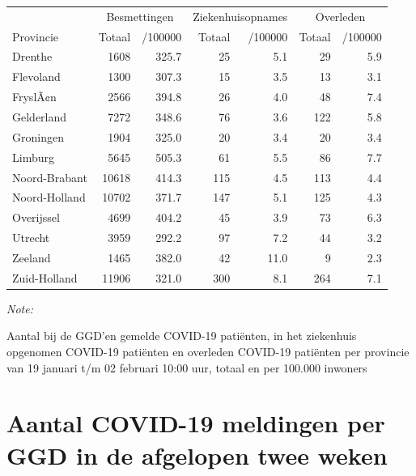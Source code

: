 \documentclass[
  english,
  man,floatsintext]{apa6}
\begin{document}
\begin{table}[H]
\centering
\begin{threeparttable}
\begin{tabular}{lrrrrrr}
\toprule
\multicolumn{1}{c}{ } & \multicolumn{2}{c}{Besmettingen} & \multicolumn{2}{c}{Ziekenhuisopnames} & \multicolumn{2}{c}{Overleden} \\
\cmidrule(l{3pt}r{3pt}){2-3} \cmidrule(l{3pt}r{3pt}){4-5} \cmidrule(l{3pt}r{3pt}){6-7}
Provincie & Totaal & /100000 & Totaal & /100000 & Totaal & /100000\\
\midrule
Drenthe & 1608 & 325.7 & 25 & 5.1 & 29 & 5.9\\
Flevoland & 1300 & 307.3 & 15 & 3.5 & 13 & 3.1\\
FryslÃ¢n & 2566 & 394.8 & 26 & 4.0 & 48 & 7.4\\
Gelderland & 7272 & 348.6 & 76 & 3.6 & 122 & 5.8\\
Groningen & 1904 & 325.0 & 20 & 3.4 & 20 & 3.4\\
Limburg & 5645 & 505.3 & 61 & 5.5 & 86 & 7.7\\
Noord-Brabant & 10618 & 414.3 & 115 & 4.5 & 113 & 4.4\\
Noord-Holland & 10702 & 371.7 & 147 & 5.1 & 125 & 4.3\\
Overijssel & 4699 & 404.2 & 45 & 3.9 & 73 & 6.3\\
Utrecht & 3959 & 292.2 & 97 & 7.2 & 44 & 3.2\\
Zeeland & 1465 & 382.0 & 42 & 11.0 & 9 & 2.3\\
Zuid-Holland & 11906 & 321.0 & 300 & 8.1 & 264 & 7.1\\
\bottomrule
\end{tabular}
\begin{tablenotes}
\item \textit{Note: } 
\item Aantal bij de GGD’en gemelde COVID-19 patiënten, in het ziekenhuis opgenomen COVID-19 patiënten en overleden COVID-19 patiënten per provincie van 19 januari t/m 02 februari 10:00 uur, totaal en per 100.000 inwoners
\end{tablenotes}
\end{threeparttable}
\end{table}

\newpage

\hypertarget{aantal-covid-19-meldingen-per-ggd-in-de-afgelopen-twee-weken}{%
\section{Aantal COVID-19 meldingen per GGD in de afgelopen twee weken}\label{aantal-covid-19-meldingen-per-ggd-in-de-afgelopen-twee-weken}}
\end{document}
